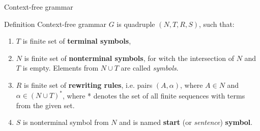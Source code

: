 \documentclass[t,usenames,dvipsnames]{beamer} %
\newcommand{\1}{\boldsymbol{1}}
\newcommand{\0}{\boldsymbol{0}}
\begin{document}
\begin{frame}{Context-free grammar}

\begin{block}{Definition}
Context-free grammar $G$ is quadruple $(N, T, R, S)$, such that:
\begin{enumerate}
\item $T$ is finite set of \textbf{terminal symbols},
\item $N$ is finite set of \textbf{nonterminal symbols},
    for witch the intersection of $N$ and $T$ is empty. Elements from \(N \cup T\) are called \textit{symbols}. 
\item $R$ is finite set of \textbf{rewriting rules}, i.e. pairs \((A, \alpha)\), where \(A \in N\) 
    and  \(\alpha \in (N \cup T)^* \), where * denotes the set of all finite sequences with
    terms from the given set.
\item $S$ is nonterminal symbol from $N$ and is named  \textbf{start} (or \textit{sentence}) \textbf{symbol}.
\end{enumerate}
\end{block}

\end{frame}
\end{document}
